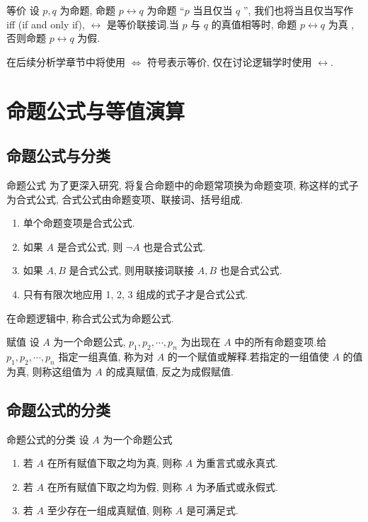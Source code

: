 \documentclass[cn,toc=twocol]{elegantbook}
\newcommand{\ITEMS}{\begin{enumerate}}
\newcommand{\ITEME}{\end{enumerate}}
\begin{document}
\begin{definition}{等价}
设 $p, q$ 为命题, 命题 $p \leftrightarrow q$ 为命题 “$p$ 当且仅当 $q$ ”, 我们也将当且仅当写作 iff (if and only if),  $\leftrightarrow$ 是等价联接词.当 $p$ 与 $q$ 的真值相等时, 命题 $p \leftrightarrow q$ 为真 , 否则命题 $p \leftrightarrow q$ 为假.
\end{definition}

\begin{remark}
在后续分析学章节中将使用 $\Leftrightarrow$ 符号表示等价, 仅在讨论逻辑学时使用 $\leftrightarrow$.	
\end{remark}

\section{命题公式与等值演算}

\subsection{命题公式与分类}

\begin{definition}{命题公式}
为了更深入研究, 将复合命题中的命题常项换为命题变项, 称这样的式子为合式公式, 合式公式由命题变项、联接词、括号组成.
\ITEMS
	\item 单个命题变项是合式公式.
	\item 如果 $A$ 是合式公式, 则 $\neg A$ 也是合式公式.
	\item 如果 $A, B$ 是合式公式, 则用联接词联接 $A, B$ 也是合式公式.
	\item 只有有限次地应用 1, 2, 3 组成的式子才是合式公式.
\ITEME
在命题逻辑中, 称合式公式为命题公式.
\end{definition}


\begin{definition}{赋值}
设 $A$ 为一个命题公式, $p_1, p_2, \cdots, p_n$ 为出现在 $A$ 中的所有命题变项.给 $p_1, p_2, \cdots, p_n$  指定一组真值, 称为对 $A$ 的一个赋值或解释.若指定的一组值使 $A$ 的值为真, 则称这组值为 $A$ 的成真赋值, 反之为成假赋值.
\end{definition}

\subsection{命题公式的分类}

\begin{definition}{命题公式的分类}
设 $A$ 为一个命题公式
\ITEMS
	\item 若 $A$ 在所有赋值下取之均为真, 则称 $A$ 为重言式或永真式.
	\item 若 $A$ 在所有赋值下取之均为假, 则称 $A$ 为矛盾式或永假式.
	\item 若 $A$ 至少存在一组成真赋值, 则称 $A$ 是可满足式.
\ITEME
\end{definition}
\end{document}
